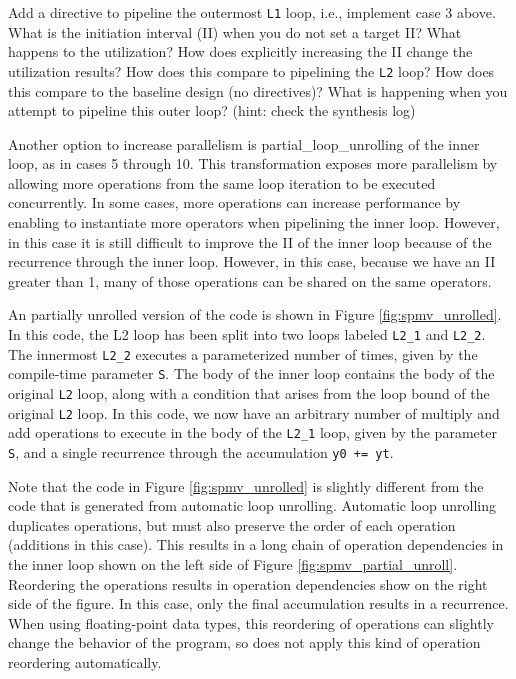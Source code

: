 \begin{exercise}
Add a directive to pipeline the outermost \lstinline{L1} loop, i.e., implement case 3 above. What is the initiation interval (II) when you do not set a target II? What happens to the utilization? How does explicitly increasing the II change the utilization results? How does this compare to pipelining the \lstinline{L2} loop? How does this compare to the baseline design (no directives)? What is happening when you attempt to pipeline this outer loop? (hint: check the synthesis log)
\end{exercise}

Another option to increase parallelism is \gls{partial_loop_unrolling} of the inner loop, as in cases 5 through 10.  This transformation exposes more parallelism by allowing more operations from the same loop iteration to be executed concurrently.   In some cases, more operations can increase performance by enabling \VHLS to instantiate more operators when pipelining the inner loop.  However, in this case it is still difficult to improve the II of the inner loop because of the recurrence through the inner loop.  However, in this case, because we have an II greater than 1, many of those operations can be shared on the same operators. 

An partially unrolled version of the code is shown in Figure \ref{fig:spmv_unrolled}.  In this code, the L2 loop has been split into two loops labeled \lstinline|L2_1| and \lstinline|L2_2|.  The innermost \lstinline|L2_2| executes a parameterized number of times, given by the compile-time parameter \lstinline|S|.  The body of the inner loop contains the body of the original \lstinline|L2| loop, along with a condition that arises from the loop bound of the original \lstinline|L2| loop.  In this code, we now have an arbitrary number of multiply and add operations to execute in the body of the \lstinline|L2_1| loop, given by the parameter \lstinline|S|, and a single recurrence through the accumulation \lstinline|y0 += yt|.

Note that the code in Figure \ref{fig:spmv_unrolled} is slightly different from the code that is generated from automatic loop unrolling.  Automatic loop unrolling duplicates operations, but must also preserve the order of each operation (additions in this case).  This results in a long chain of operation dependencies in the inner loop shown on the left side of Figure \ref{fig:spmv_partial_unroll}.  Reordering the operations results in operation dependencies show on the right side of the figure.  In this case, only the final accumulation results in a recurrence.   When using floating-point data types, this reordering of operations can slightly change the behavior of the program, so \VHLS does not apply this kind of operation reordering automatically.  

